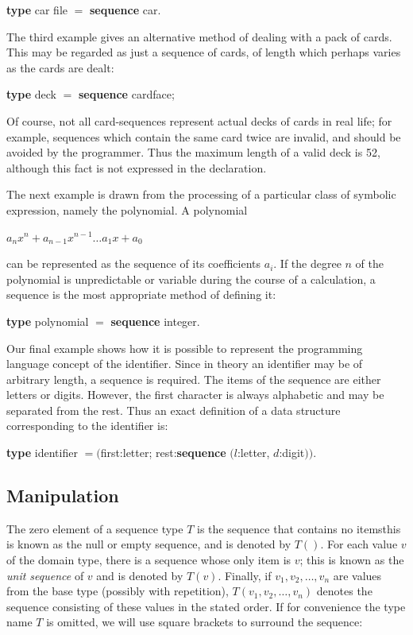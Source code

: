 \quad \textbf{type} car file $=$ \textbf{sequence} car.

The third example gives an alternative method of dealing with a pack of cards. This may be regarded as just a sequence of cards, of length which perhaps varies as the cards are dealt:

\quad \textbf{type} deck $=$ \textbf{sequence} cardface;

\noindent
Of course, not all card-sequences represent actual decks of cards in real life; for example, sequences which contain the same card twice are invalid, and should be avoided by the programmer. Thus the maximum length of a valid deck is 52, although this fact is not expressed in the declaration.

The next example is drawn from the processing of a particular class of symbolic expression, namely the polynomial. A polynomial

$a_n x^n + a_{n-1}x^{n-1}\dots a_1 x + a_0$

\noindent
can be represented as the sequence of its coefficients $a_i$. If the degree $n$ of the polynomial is unpredictable or variable during the course of a calculation, a sequence is the most appropriate method of defining it:

\quad \textbf{type} polynomial $=$ \textbf{sequence} integer.

Our final example shows how it is possible to represent the programming language concept of the identifier. Since in theory an identifier may be of arbitrary length, a sequence is required. The items of the sequence are either letters or digits. However, the first character is always alphabetic and may be separated from the rest. Thus an exact definition of a data structure corresponding to the identifier is:

\quad \textbf{type} identifier $= ($first:letter; rest:\textbf{sequence} $(l$:letter, $d$:digit$))$.

\subsection{Manipulation}

The zero element of a sequence type $T$ is the sequence that contains no items\textemdash{}this is known as the null or empty sequence, and is denoted by $T()$. For each value $v$ of the domain type, there is a sequence whose only item is $v$; this is known as the \textit{unit sequence} of $v$ and is denoted by $T(v)$. Finally, if $v_1, v_2, \dots, v_n$ are values from the base type (possibly with repetition),
$T(v_1, v_2, \dots, v_n)$ denotes the sequence consisting of these values in the stated order. If for convenience the type name $T$ is omitted, we will use square brackets to surround the sequence:

